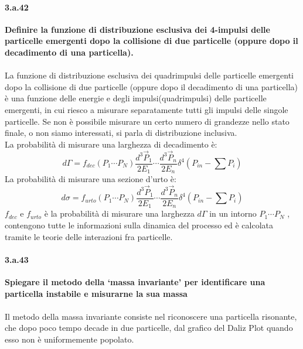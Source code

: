 \documentclass[twoside]{article}
\begin{document}
\paragraph{3.a.42}\textbf{Definire la funzione di distribuzione esclusiva dei 4-impulsi delle particelle emergenti dopo la collisione di due particelle (oppure dopo il decadimento di una particella).}\\
\\
La funzione di distribuzione esclusiva dei quadrimpulsi delle particelle emergenti dopo la collisione di due particelle (oppure dopo il decadimento di una particella) è una funzione delle energie e degli impulsi(quadrimpulsi) delle particelle emergenti, in cui riesco a misurare separatamente tutti gli impulsi delle singole particelle. Se non è possibile misurare un certo numero di grandezze nello stato finale, o non siamo interessati, si parla di distribuzione inclusiva.\\
La probabilità di misurare una larghezza di decadimento è:
\begin{equation}
    d\Gamma= f_{dec}( P_1 \cdots P_N)\frac{d^3\vec{P}_1}{2 E_1} \cdots \frac{d^3\vec{P}_n}{2 E_n} \delta^4(P_{in}-\sum P_i)
\end{equation}
La probabilità di misurare una sezione d'urto è:
\begin{equation}
    d\sigma= f_{urto}( P_1 \cdots P_N)\frac{d^3\vec{P}_1}{2 E_1} \cdots \frac{d^3\vec{P}_n}{2 E_n} \delta^4(P_{in}-\sum P_i)
\end{equation}
$f_{dec}$ e $f_{urto}$ è la probabilità di misurare una larghezza $d\Gamma$ in un intorno $P_1 \cdots P_N$ , contengono tutte le informazioni sulla dinamica del processo ed è calcolata tramite le teorie delle interazioni fra particelle.

\paragraph{3.a.43}\textbf{Spiegare il metodo della ‘massa invariante’ per identificare una particella instabile e misurarne la sua massa}\\ \\
Il metodo della massa invariante consiste nel riconoscere una particella risonante, che dopo poco tempo decade in due particelle, dal grafico del Daliz Plot quando esso non è uniformemente popolato.
\end{document}

